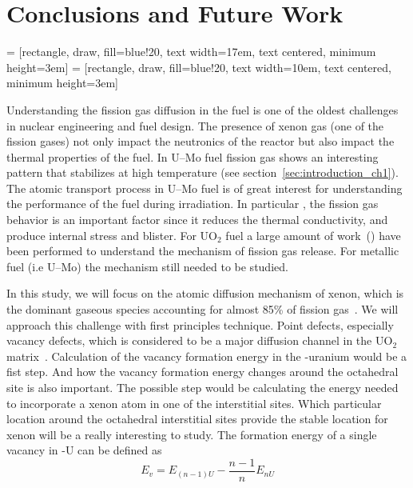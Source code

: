 \chapter{Conclusions and Future Work}

 = [rectangle, draw, fill=blue!20,
    text width=17em, text centered, minimum height=3em]
 = [rectangle, draw, fill=blue!20,
	text width=10em, text centered, minimum height=3em]


Understanding the fission gas diffusion in the fuel is one of the oldest challenges in nuclear engineering and fuel design. The presence of xenon gas (one of the fission gases) not only impact the neutronics of the reactor but also impact the thermal properties of the fuel. In U--Mo fuel fission gas shows an interesting pattern that stabilizes at high temperature (see section~\ref{sec:introduction_ch1}). The atomic transport process in U--Mo fuel is of great interest for understanding the performance of the fuel during irradiation. In particular , the fission gas behavior is an important factor since it reduces the thermal conductivity, and produce internal stress and blister. For UO$_2$ fuel a large amount of work~(\cite{petit1999location, crocombette2002ab, freyss2006ab}) have been performed to understand the mechanism of fission gas release. For metallic fuel (i.e U--Mo) the mechanism still needed to be studied.

In this study, we will focus on the atomic diffusion mechanism of xenon, which is the dominant gaseous species accounting for almost 85\% of fission gas~\cite{blades1956ratio, petruska1955absolute}. We will approach this challenge with first principles technique. Point defects, especially vacancy defects, which is considered to be a major diffusion channel in the UO$_2$ matrix~\cite{petit1999location}. Calculation of the vacancy formation energy in the \textgamma-uranium would be a fist step. And how the vacancy formation energy changes around the octahedral site is also important. The possible step would be calculating the energy needed to incorporate a xenon atom in one of the interstitial sites. Which particular location around the octahedral interstitial sites provide the stable location for xenon will be a really interesting to study. The formation energy of a single vacancy in \textgamma-U can be defined as
\begin{equation}
\label{eq_vacancy}
E_v = E_{(n-1)U} - \frac{n-1}{n} E_{nU}
\end{equation}

